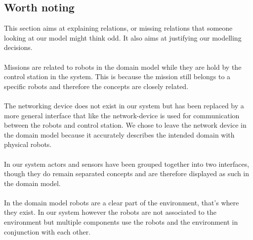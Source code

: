 \subsection{Worth noting}
This section aims at explaining relations, or missing relations that someone looking at our model might think odd. It also aims at justifying our modelling decisions.
\\ \\
Missions are related to robots in the domain model while they are hold by the control station in the system. 
This is because the mission still belongs to a specific robots and therefore the concepts are closely related. 
\\ \\
The networking device does not exist in our system but has been replaced by a more general interface that like the network-device is used for communication between the robots and control station. We chose to leave the network device in the domain model because it accurately describes the intended domain with physical robots.
\\ \\
In our system actors and sensors have been grouped together into two interfaces, though they do remain separated concepts and are therefore displayed as such in the domain model.
\\ \\
In the domain model robots are a clear part of the environment, that's where they exist. In our system however the robots are not associated to the environment but multiple components use the robots and the environment in conjunction with each other.
